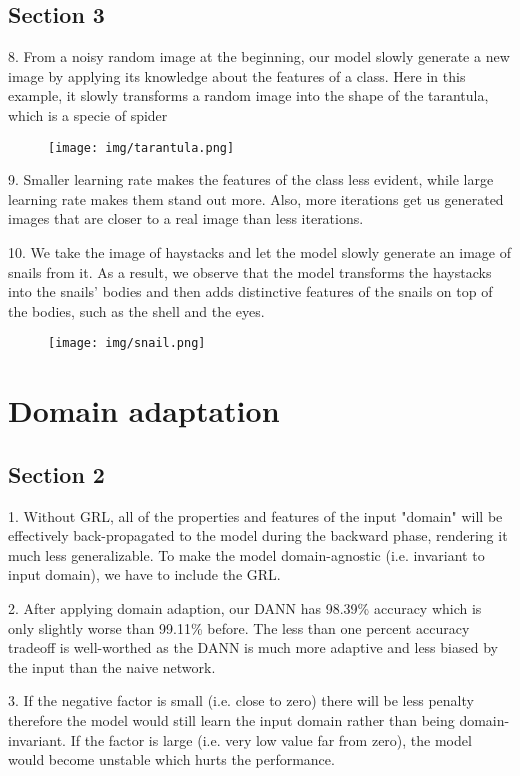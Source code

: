 \subsection{Section 3}

8. From a noisy random image at the beginning, our model slowly generate a new image by applying its knowledge about the features of a class. Here in this example, it slowly transforms a random image into the shape of the tarantula, which is a specie of spider
\begin{figure}[H]
  \centering
    \texttt{[image: img/tarantula.png]}
\end{figure}

9. Smaller learning rate makes the features of the class less evident, while large learning rate makes them stand out more. Also, more iterations get us generated images that are closer to a real image than less iterations.

10. We take the image of haystacks and let the model slowly generate an image of snails from it. As a result, we observe that the model transforms the haystacks into the snails' bodies and then adds distinctive features of the snails on top of the bodies, such as the shell and the eyes.
\begin{figure}[H]
  \centering
    \texttt{[image: img/snail.png]}
\end{figure}

\section{Domain adaptation}

\subsection{Section 2}

1. Without GRL, all of the properties and features of the input "domain" will be effectively back-propagated to the model during the backward phase, rendering it much less generalizable. To make the model domain-agnostic (i.e. invariant to input domain), we have to include the GRL.

2. After applying domain adaption, our DANN has 98.39\% accuracy which is only slightly worse than 99.11\% before. The less than one percent accuracy tradeoff is well-worthed as the DANN is much more adaptive and less biased by the input than the naive network.

3. If the negative factor is small (i.e. close to zero) there will be less penalty therefore the model would still learn the input domain rather than being domain-invariant. If the factor is large (i.e. very low value far from zero), the model would become unstable which hurts the performance.

